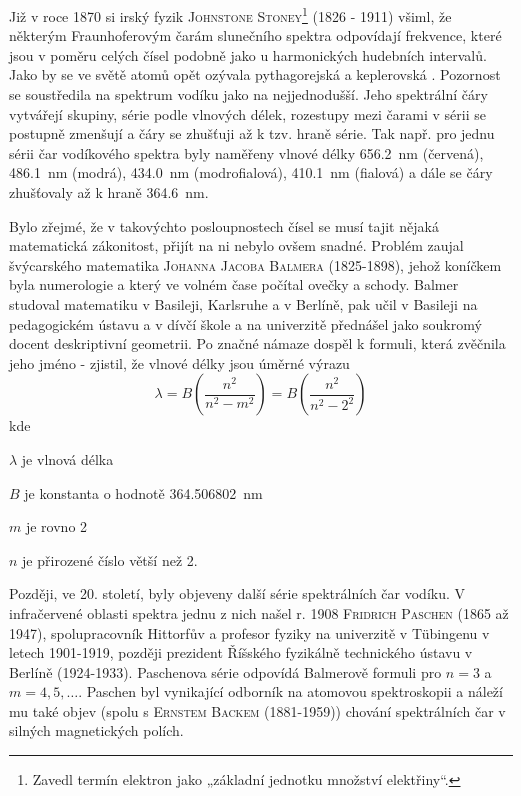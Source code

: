         Již v roce 1870 si irský fyzik \textsc{Johnstone Stoney}\footnote{Zavedl termín elektron
        jako „základní jednotku množství elektřiny“.} (1826 - 1911) všiml, že některým
        Fraunhoferovým čarám slunečního spektra odpovídají frekvence, které jsou v poměru celých
        čísel podobně jako u harmonických hudebních intervalů. Jako by se ve světě atomů opět
        ozývala pythagorejská a keplerovská . Pozornost se soustředila na spektrum
        vodíku jako na nejjednodušší. Jeho spektrální čáry vytvářejí skupiny, série podle vlnových
        délek, rozestupy mezi čarami v sérii se postupně zmenšují a čáry se zhušťuji až k tzv. hraně
        série. Tak např. pro jednu sérii čar vodíkového spektra byly naměřeny vlnové délky
        \SI{656.2}{\nm} (červená), \SI{486.1}{\nm} (modrá), \SI{434.0}{\nm} (modrofialová),
        \SI{410.1}{\nm} (fialová) a dále se čáry zhušťovaly až k hraně \SI{364.6}{\nm}.

        Bylo zřejmé, že v takovýchto posloupnostech čísel se musí tajit nějaká matematická
        zákonitost, přijít na ni nebylo ovšem snadné. Problém zaujal švýcarského matematika
        \textsc{Johanna Jacoba Balmera} (1825-1898), jehož koníčkem byla numerologie a který ve
        volném čase počítal ovečky a schody. Balmer studoval matematiku v Basileji, Karlsruhe a v
        Berlíně, pak učil v Basileji na pedagogickém ústavu a v dívčí škole a na univerzitě
        přednášel jako soukromý docent deskriptivní geometrii. Po značné námaze dospěl k formuli,
        která zvěčnila jeho jméno - zjistil, že vlnové délky jsou úměrné výrazu
        \begin{equation*}
          \lambda = B\left(\dfrac{n^2}{n^2-m^2}\right) = B\left(\dfrac{n^2}{n^2-2^2}\right)
        \end{equation*} 
        kde
        \begin{description}[leftmargin=3em,labelindent=1em, style=nextline]
          \item \(\lambda\) je vlnová délka
          \item \(B\) je konstanta o hodnotě \SI{364.506802}{\nm}
          \item \(m\) je rovno \num{2}
          \item \(n\) je přirozené číslo větší než \num{2}. 
        \end{description}

        Později, ve 20. století, byly objeveny další série spektrálních čar vodíku. V infračervené
        oblasti spektra jednu z nich našel r. 1908 \textsc{Fridrich Paschen} (1865 až 1947),
        spolupracovník Hittorfův a profesor fyziky na univerzitě v Tübingenu v letech 1901-1919,
        později prezident Říšského fyzikálně technického ústavu v Berlíně (1924-1933). Paschenova
        série odpovídá Balmerově formuli pro \(n = 3\) a \(m = 4, 5,\ldots\). Paschen byl vynikající
        odborník na atomovou spektroskopii a náleží mu také objev (spolu s \textsc{Ernstem Backem}
        (1881-1959)) chování spektrálních čar v silných magnetických polích.
    
